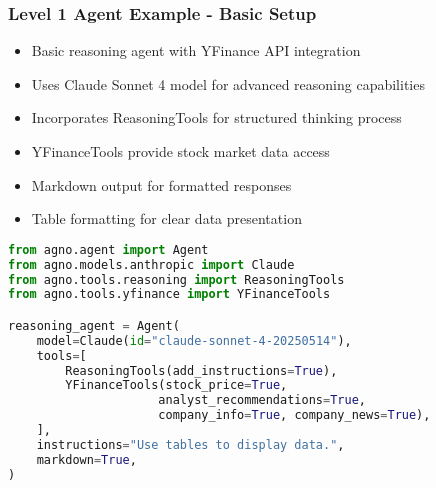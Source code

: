 \begin{frame}[fragile]\frametitle{Level 1 Agent Example - Basic Setup}
      \begin{itemize}
	\item Basic reasoning agent with YFinance API integration
	\item Uses Claude Sonnet 4 model for advanced reasoning capabilities
	\item Incorporates ReasoningTools for structured thinking process
	\item YFinanceTools provide stock market data access
	\item Markdown output for formatted responses
	\item Table formatting for clear data presentation
	  \end{itemize}
      
      \begin{lstlisting}[language=python, basicstyle=\tiny]
from agno.agent import Agent
from agno.models.anthropic import Claude
from agno.tools.reasoning import ReasoningTools
from agno.tools.yfinance import YFinanceTools

reasoning_agent = Agent(
    model=Claude(id="claude-sonnet-4-20250514"),
    tools=[
        ReasoningTools(add_instructions=True),
        YFinanceTools(stock_price=True, 
                     analyst_recommendations=True, 
                     company_info=True, company_news=True),
    ],
    instructions="Use tables to display data.",
    markdown=True,
)
      \end{lstlisting}
\end{frame}

